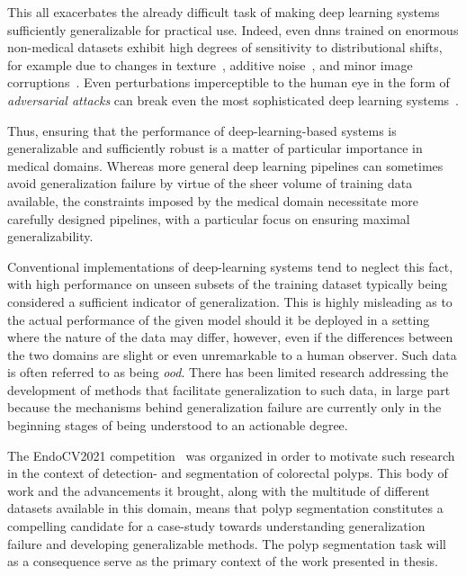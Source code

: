     This all exacerbates the already difficult task of making deep learning systems sufficiently generalizable for practical use. Indeed, even \glspl{dnn} trained on enormous non-medical datasets exhibit high degrees of sensitivity to distributional shifts, for example due to changes in texture~\cite{texturebias}, additive noise~\cite{noise_robustness}, and minor image corruptions~\cite{corruption_robustness}. Even perturbations imperceptible to the human eye in the form of \textit{adversarial attacks} can break even the most sophisticated deep learning systems~\cite{adversarial_attacks}.
    
    Thus, ensuring that the performance of deep-learning-based systems is generalizable and sufficiently robust is a matter of particular importance in medical domains. Whereas more general deep learning pipelines can sometimes avoid generalization failure by virtue of the sheer volume of training data available, the constraints imposed by the medical domain necessitate more carefully designed pipelines, with a particular focus on ensuring maximal generalizability. 
    
    Conventional implementations of deep-learning systems tend to neglect this fact, with high performance on unseen subsets of the training dataset typically being considered a sufficient indicator of generalization. This is highly misleading as to the actual performance of the given model should it be deployed in a setting where the nature of the data may differ, however, even if the differences between the two domains are slight or even unremarkable to a human observer. Such data is often referred to as being \textit{\gls{ood}}. There has been limited research addressing the development of methods that facilitate generalization to such data, in large part because the mechanisms behind generalization failure are currently only in the beginning stages of being understood to an actionable degree.
    
    The EndoCV2021 competition~\cite{endocv2021} was organized in order to motivate such research in the context of detection- and segmentation of colorectal polyps. This body of work and the advancements it brought, along with the multitude of different datasets available in this domain, means that polyp segmentation constitutes a compelling candidate for a case-study towards understanding generalization failure and developing generalizable methods. The polyp segmentation task will as a consequence serve as the primary context of the work presented in thesis.
    
